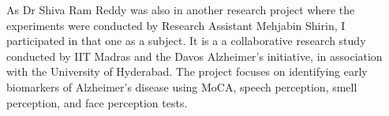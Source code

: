 As Dr Shiva Ram Reddy was also in another research project where the experiments
were conducted by Research Assistant Mehjabin Shirin, I participated in that one
as a subject. It is a a collaborative research study conducted by IIT Madras and
the Davos Alzheimer's initiative, in association with the University of
Hyderabad. The project focuses on identifying early biomarkers of Alzheimer's
disease using MoCA, speech perception, smell perception, and face perception
tests.